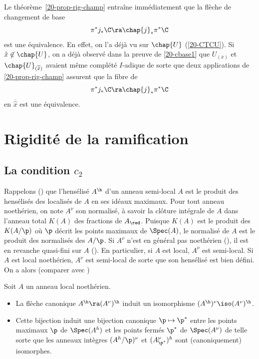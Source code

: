 \documentclass[10pt]{../fichiers-configuration-latex/smfart}
\begin{document}
\begin{remarques2}\label{20CTC} Le théorème~\ref{20-prop-rig-champ} entraîne immédiatement que la
flèche de changement de base $$\pi^*j_*\C\ra\chap{j}_*\pi^*\C$$ est une équivalence. En effet, on
l'a déjà vu sur $\chap{U}$ (\ref{20-CTCU}). Si $\hat{x}\not\in\chap{U}$, on a déjà observé dans la
preuve de \ref{20-cbase1} que $U_{(\bar x)}$ et $\chap{U}_{(\overline{\hat x})}$ avaient même
complété $I$-adique de sorte que deux applications de \ref{20-prop-rig-champ} assurent que la fibre
de $$\pi^*j_*\C\ra\chap{j}_*\pi^*\C$$ en $\overline{\hat x}$ est une
équivalence.\end{remarques2}



\section{Rigidité de la ramification}

\subsection{La condition $c_2$}

Rappelons () que l'hensélisé $A^\h$ d'un anneau semi-local $A$ est le produit
des hensélisés des localisés de $A$ en ses idéaux maximaux. Pour tout anneau noethérien, on note
$A^\nu$ son normalisé, à savoir la clôture intégrale de $A$ dans l'anneau total $K(A)$ des fractions
de $A_\red$. Puisque $K(A)$ est le produit des $K(A/\p)$ où $\p$ décrit les points maximaux de
$\Spec(A)$, le normalisé de $A$ est le produit des normalisés des $A/\p$. Si $A^\nu$ n'est en
général pas noethérien (\cite[exemple 5 de l'appendice]{Nag62}), il est en revanche quasi-fini sur
$A$ (\cite[V.33.10]{Nag62}). En particulier, si $A$ est local, $A^\nu$ est semi-local. Si $A$ est
local noethérien, $A^\nu$ est semi-local de sorte que son hensélisé est bien défini. On a alors
(comparer avec \cite[43.20 et exercice 43.21]{Nag62})

\begin{lemme}\label{20hnu=nuh}Soit $A$ un anneau local noethérien.  \begin{itemize} \item La flèche
canonique $A^\h\ra (A^\nu)^\h$ induit un isomorphisme $(A^\h)^\nu\iso (A^\nu)^\h$.  \item Cette
bijection induit une bijection canonique $\p\mapsto\p^*$ entre les points maximaux $\p$ de
$\Spec(A^h)$ et les points fermés $\p^*$ de $\Spec(A^\nu)$  de telle sorte que les anneaux intègres
$(A^h/\p)^\nu$ et $(A^\nu_{\p^*})^h$  sont (canoniquement) isomorphes.  \end{itemize} \end{lemme}
\end{document}
